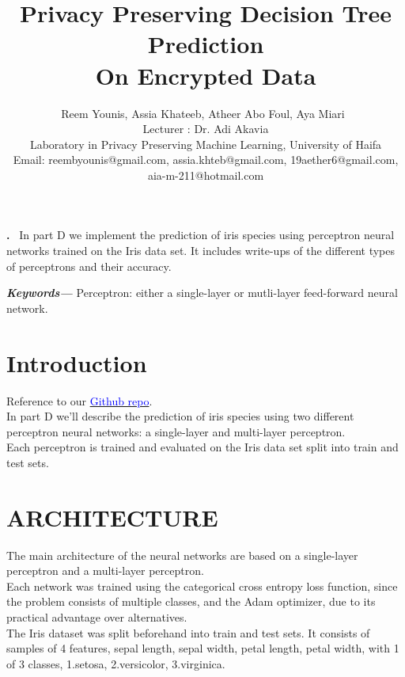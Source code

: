 \documentclass[12pt]{article}
\renewenvironment{abstract}
 {\par\noindent\textbf{\abstractname.}\ \ignorespaces}
 {\par\medskip}
\providecommand{\keywords}[1]
{
  \small	
  \textbf{\textit{Keywords---}} #1
}
\begin{document}
\title{Privacy Preserving Decision Tree Prediction \\ On Encrypted Data}


\author{Reem Younis, Assia Khateeb, Atheer Abo Foul, Aya Miari\
\\
Lecturer : Dr. Adi Akavia
\\Laboratory in Privacy Preserving Machine Learning, 
University of Haifa\\
\small{Email: reembyounis@gmail.com, assia.khteb@gmail.com, 19aether6@gmail.com, aia-m-211@hotmail.com}

}
\maketitle
\tableofcontents

\newpage

\begin{abstract}
In part D we implement the prediction of iris species using perceptron neural networks trained on the Iris data set. It includes write-ups of the different types of perceptrons and their accuracy.

\end{abstract}

\keywords{Perceptron: either a single-layer or mutli-layer feed-forward neural network.}



\section{Introduction}
Reference to our \href{https://github.com/assiakhateeb/PPML_lab/tree/main/part\%20D}{\textcolor{blue}{Github repo}}.\\
In part D we'll  describe the                 
prediction of iris species using two different   perceptron neural networks: a single-layer and multi-layer perceptron.\\ Each perceptron is trained and evaluated on the Iris data set split into train and test sets. 

\section{\small{ARCHITECTURE}}
The main architecture of the neural networks are based on a single-layer perceptron and a multi-layer perceptron.\\
Each network was trained using the             
categorical cross entropy loss function, since the problem consists of multiple classes, and the Adam optimizer, due to its practical advantage over alternatives. \\
The Iris dataset was split beforehand into train and test sets. It consists of samples of 4 features, sepal length, sepal width, petal length, petal width, with 1 of 3 classes, 1.setosa,               
2.versicolor,
3.virginica.
\end{document}
